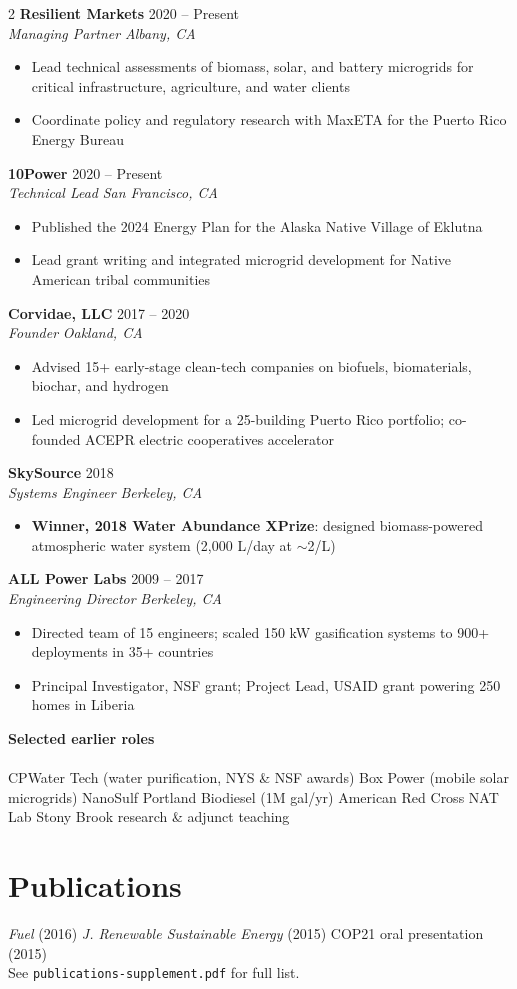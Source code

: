 \documentclass[10pt,letterpaper]{article}
\newcommand{\role}[4]{%
  {\bfseries #1} \hfill {\small #2}\\[-1pt]
  {\itshape #3} \hfill {\small\itshape #4}\\[2pt]
}
\begin{document}
\begin{paracol}{2}
\role{Resilient Markets}{2020 -- Present}{Managing Partner}{Albany, CA}
\begin{itemize}[nosep, leftmargin=*, topsep=0pt]
  \item Lead technical assessments of biomass, solar, and battery microgrids for critical infrastructure, agriculture, and water clients
  \item Coordinate policy and regulatory research with MaxETA for the Puerto Rico Energy Bureau
\end{itemize}

\role{10Power}{2020 -- Present}{Technical Lead}{San Francisco, CA}
\begin{itemize}[nosep, leftmargin=*, topsep=0pt]
  \item Published the 2024 Energy Plan for the Alaska Native Village of Eklutna
  \item Lead grant writing and integrated microgrid development for Native American tribal communities
\end{itemize}

\role{Corvidae, LLC}{2017 -- 2020}{Founder}{Oakland, CA}
\begin{itemize}[nosep, leftmargin=*, topsep=0pt]
  \item Advised 15+ early-stage clean-tech companies on biofuels, biomaterials, biochar, and hydrogen
  \item Led microgrid development for a 25-building Puerto Rico portfolio; co-founded ACEPR electric cooperatives accelerator
\end{itemize}

\role{SkySource}{2018}{Systems Engineer}{Berkeley, CA}
\begin{itemize}[nosep, leftmargin=*, topsep=0pt]
  \item \textbf{Winner, 2018 Water Abundance XPrize}: designed biomass-powered atmospheric water system (2,000 L/day at $\sim$2\textcent/L)
\end{itemize}

\role{ALL Power Labs}{2009 -- 2017}{Engineering Director}{Berkeley, CA}
\begin{itemize}[nosep, leftmargin=*, topsep=0pt]
  \item Directed team of 15 engineers; scaled 150 kW gasification systems to 900+ deployments in 35+ countries
  \item Principal Investigator, NSF grant; Project Lead, USAID grant powering 250 homes in Liberia
\end{itemize}

\role{Selected earlier roles}{}{}{}
{\small CPWater Tech (water purification, NYS \& NSF awards) \textbullet{} Box Power (mobile solar microgrids) \textbullet{} NanoSulf \textbullet{} Portland Biodiesel (1M gal/yr) \textbullet{} American Red Cross NAT Lab \textbullet{} Stony Brook research \& adjunct teaching}

\section{Publications}
{\small
\textit{Fuel} (2016) \textbullet{} \textit{J. Renewable Sustainable Energy} (2015) \textbullet{} COP21 oral presentation (2015)\\
See \texttt{publications-supplement.pdf} for full list.
}

\end{paracol}
\end{document}
